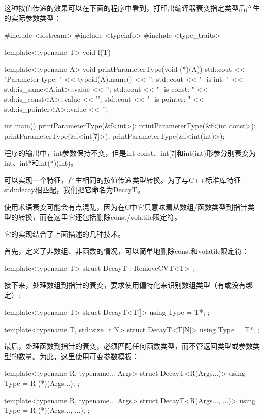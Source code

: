 这种按值传递的效果可以在下面的程序中看到，打印出编译器衰变指定类型后产生的实际参数类型：

\begin{cpp}
#include <iostream>
#include <typeinfo>
#include <type_traits>

template<typename T>
void f(T) { }

template<typename A>
void printParameterType(void (*)(A)) {
	std::cout << "Parameter type: " << typeid(A).name() << '\n';
	std::cout << "- is int: " << std::is_same<A,int>::value << '\n';
	std::cout << "- is const: " << std::is_const<A>::value << '\n';
	std::cout << "- is pointer: " << std::is_pointer<A>::value << '\n';
}

int main() {
	printParameterType(&f<int>);
	printParameterType(&f<int const>);
	printParameterType(&f<int[7]>);
	printParameterType(&f<int(int)>);
}
\end{cpp}

程序的输出中，int参数保持不变，但是int const、int[7]和int(int)形参分别衰变为int、int*和int(*)(int)。

可以实现一个特征，产生相同的按值传递类型转换。为了与C++标准库特征std::decay相匹配，我们把它命名为DecayT。

\begin{notice}
使用术语衰变可能会有点混乱，因为在C中它只意味着从数组/函数类型到指针类型的转换，而在这里它还包括删除const/volatile限定符。
\end{notice}

它的实现结合了上面描述的几种技术。

首先，定义了非数组、非函数的情况，可以简单地删除const和volatile限定符：

\begin{cpp}
template<typename T>
struct DecayT : RemoveCVT<T> {};
\end{cpp}

接下来，处理数组到指针的衰变，要求使用偏特化来识别数组类型（有或没有绑定）:

\begin{cpp}
template<typename T>
struct DecayT<T[]> {
	using Type = T*;
};

template<typename T, std::size_t N>
struct DecayT<T[N]> {
	using Type = T*;
};
\end{cpp}

最后，处理函数到指针的衰变，必须匹配任何函数类型，而不管返回类型或参数类型的数量。为此，这里使用可变参数模板：

\begin{cpp}
template<typename R, typename... Args>
struct DecayT<R(Args...)> {
	using Type = R (*)(Args...);
};

template<typename R, typename... Args>
struct DecayT<R(Args..., ...)> {
	using Type = R (*)(Args..., ...);
};
\end{cpp}

